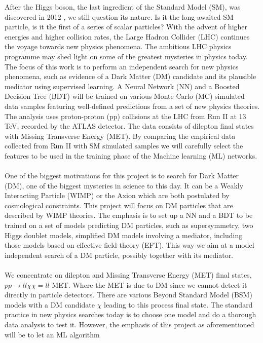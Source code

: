 \documentclass[12pt, a4paper]{book}
\begin{document}
After the Higgs boson, the last ingredient of the Standard Model (SM), was discovered in 2012 \cite{Higgs_discovery_2012}, we still question its nature. Is it the long-awaited SM particle, is it the first of a series of scalar particles? 
With the advent of higher energies and higher collision rates, the Large Hadron Collider (LHC) continues the voyage towards new physics phenomena. The ambitious LHC physics programme may shed light on some of the greatest mysteries in physics today. 
The focus of this work is to perform an independent search for new physics phenomena, such as evidence of a Dark Matter (DM) candidate and its plausible mediator using supervised learning. A Neural Network (NN) and a Boosted Decision Tree (BDT) will 
be trained on various Monte Carlo (MC) simulated data samples featuring well-defined predictions from a set of new physics theories. The analysis uses proton-proton (pp) collisions at the LHC from Run II at 13 TeV, recorded by the ATLAS detector. 
The data consists of dilepton final states with Missing Transverse Energy (MET). By comparing the empirical data collected from Run II with SM simulated samples we will carefully select the features to be used in the training phase of the Machine learning 
(ML) networks. \\
\\ One of the biggest motivations for this project is to search for Dark Matter (DM), one of the biggest mysteries in science to this day. It can be a Weakly Interacting Particle (WIMP) \cite{WIMP} or the Axion \cite{Axion} which are both postulated by cosmological constraints. 
This project will focus on DM particles that are described by WIMP theories. The emphasis is to set up a NN and a BDT to be trained on a set of models predicting DM particles, such as supersymmetry, two Higgs doublet models, simplified DM models involving a mediator, including those 
models based on effective field theory (EFT). This way we aim at a model independent search of a DM particle, possibly together with its mediator.\\
\\ We concentrate on dilepton and Missing Transverse Energy (MET) final states, $pp\rightarrow ll \chi\chi = ll$ MET. Where the MET is due to DM since we cannot detect it directly in particle detectors. There are various Beyond Standard Model (BSM) models 
with a DM candidate $\chi$ leading to this process final state. The standard practice in new physics searches today is to choose one model and do a thorough data analysis to test it. However, the emphasis of this project as aforementioned will be to let an ML algorithm 
\end{document}
